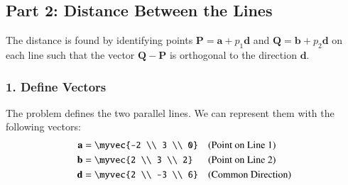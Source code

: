 \documentclass[journal]{IEEEtran}
\newcommand{\mat}[1]{\mathbf{#1}}
\begin{document}
\subsection*{Part 2: Distance Between the Lines}
The distance is found by identifying points $\mat{P} = \mat{a} + p_1\mat{d}$ and $\mat{Q} = \mat{b} + p_2\mat{d}$ on each line such that the vector $\mat{Q}-\mat{P}$ is orthogonal to the direction $\mat{d}$.

\subsubsection*{1. Define Vectors}
The problem defines the two parallel lines. We can represent them with the following vectors:
\begin{align}
\mat{a} &= \myvec{-2 \\ 3 \\ 0} & & \text{(Point on Line 1)} \\
\mat{b} &= \myvec{2 \\ 3 \\ 2} & & \text{(Point on Line 2)} \\
\mat{d} &= \myvec{2 \\ -3 \\ 6} & & \text{(Common Direction)}
\end{align}
\end{document}
